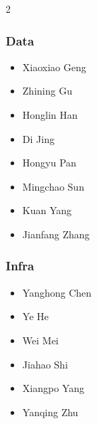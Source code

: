 \begin{multicols}{2}
\begin{itemize}
\end{itemize}

\columnbreak

\subsubsection*{Data}
\begin{itemize}
\item Xiaoxiao Geng
\item Zhining Gu
\item Honglin Han
\item Di Jing
\item Hongyu Pan
\item Mingchao Sun
\item Kuan Yang
\item Jianfang Zhang

\end{itemize}

\subsubsection*{Infra}
\begin{itemize}
\item Yanghong Chen
\item Ye He
\item Wei Mei
\item Jiahao Shi
\item Xiangpo Yang
\item Yanqing Zhu

\end{itemize}


\end{multicols}
